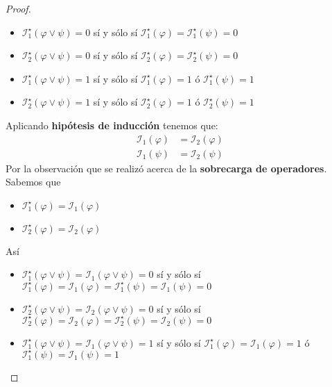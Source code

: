 \documentclass[a4paper]{article}
\begin{document}
\begin{proof}
\begin{itemize}
        \item \(\mathcal{I}^{\star}_{1}\left(\varphi \lor \psi\right) = 0\) sí y sólo sí \(\mathcal{I}^{\star}_{1}\left( \varphi\right) = \mathcal{I}^{\star}_{1}\left( \psi\right) = 0\)
        \item \(\mathcal{I}^{\star}_{2}\left(\varphi \lor \psi\right) = 0\) sí y sólo sí \(\mathcal{I}^{\star}_{2}\left( \varphi\right) = \mathcal{I}^{\star}_{2}\left( \psi\right) = 0\)
        \item \(\mathcal{I}^{\star}_{1}\left(\varphi \lor \psi\right) = 1\) sí y sólo sí \(\mathcal{I}^{\star}_{1}\left( \varphi\right) = 1\) ó \(\mathcal{I}^{\star}_{1}\left( \psi\right) = 1\)
        \item \(\mathcal{I}^{\star}_{2}\left(\varphi \lor \psi\right) = 1\) sí y sólo sí \(\mathcal{I}^{\star}_{2}\left( \varphi\right) = 1\) ó \(\mathcal{I}^{\star}_{2}\left( \psi\right) = 1\)
    \end{itemize}
    Aplicando \textbf{hipótesis de inducción} tenemos que:
    \begin{align*}
        \mathcal{I}_1(\varphi) &= \mathcal{I}_2(\varphi) \\
        \mathcal{I}_1(\psi) &= \mathcal{I}_2(\psi)
    \end{align*}
    Por la observación que se realizó acerca de la \textbf{sobrecarga de operadores}. Sabemos que 
    \begin{itemize}
        \item \(\mathcal{I}^{\star}_{1}\left(\varphi\right) = \mathcal{I}_{1}\left(\varphi\right)\)
        \item \(\mathcal{I}^{\star}_{2}\left(\varphi\right) = \mathcal{I}_{2}\left(\varphi\right)\)
    \end{itemize}
    Así
    \begin{itemize}
        \item \(\mathcal{I}^{\star}_{1}\left(\varphi \lor \psi\right) = \mathcal{I}_{1}\left(\varphi \lor \psi\right) = 0\) sí y sólo sí \(\mathcal{I}^{\star}_{1}\left( \varphi\right) = \mathcal{I}_{1}\left( \varphi\right) = \mathcal{I}^{\star}_{1}\left( \psi\right) = \mathcal{I}_{1}\left( \psi\right) = 0\)
        \item \(\mathcal{I}^{\star}_{2}\left(\varphi \lor \psi\right) = \mathcal{I}_{2}\left(\varphi \lor \psi\right) = 0\) sí y sólo sí \(\mathcal{I}^{\star}_{2}\left( \varphi\right) = \mathcal{I}_{2}\left( \varphi\right) = \mathcal{I}^{\star}_{2}\left( \psi\right) = \mathcal{I}_{2}\left( \psi\right) = 0\)
        \item \(\mathcal{I}^{\star}_{1}\left(\varphi \lor \psi\right) = \mathcal{I}_{1}\left(\varphi \lor \psi\right) = 1\) sí y sólo sí \(\mathcal{I}^{\star}_{1}\left( \varphi\right) = \mathcal{I}_{1}\left( \varphi\right) = 1\) ó \(\mathcal{I}^{\star}_{1}\left(\psi\right) = \mathcal{I}_{1}\left(\psi\right) = 1\)

\end{itemize}
\end{proof}
\end{document}
